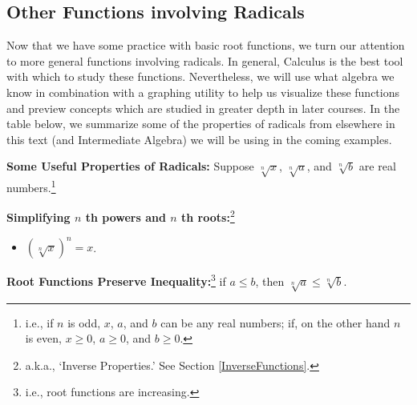 \documentclass{ximera}
\begin{document}
\subsection{Other Functions involving Radicals}
\label{OtherFunctionsinvolvingRadicals}

Now that we have some practice with basic root functions, we turn our attention to more general functions involving radicals.  In general, Calculus is the best tool with which to study these functions.  Nevertheless,  we will use what algebra we know in combination with a graphing utility to help us visualize these functions and preview concepts which are studied in greater depth in later courses. In the table below, we summarize some of the properties of radicals from elsewhere in this text (and Intermediate Algebra) we will be using in the coming examples.  

\colorbox{ResultColor}{\bbm

\begin{thm} \label{basicradicalpropseqineq}  \textbf{Some Useful Properties of Radicals:}  Suppose $\sqrt[n]{x}$, $\sqrt[n]{a}$, and $\sqrt[n]{b}$ are real numbers.\footnote{i.e., if $n$ is odd, $x$, $a$, and $b$ can be any real numbers;  if, on the other hand $n$ is even, $x \geq 0$, $a \geq 0$, and $b \geq 0$.}


\textbf{Simplifying $n$ th powers and $n$ th roots:}\footnote{a.k.a., `Inverse Properties.'  See Section \ref{InverseFunctions}.}

\begin{itemize}

\item  $\left( \sqrt[n]{x}\right)^n = x$.


\end{itemize}

\textbf{Root Functions Preserve Inequality:}\footnote{i.e., root functions are increasing.}  if $a \leq b$, then $\sqrt[n]{a} \leq \sqrt[n]{b}$.

\end{thm}
\ebm}
\end{document}
